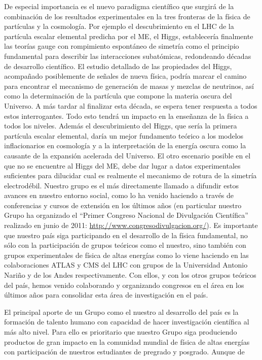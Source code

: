 \begin{bbrpvlhc}
De especial importancia es el nuevo paradigma científico que surgirá
de la combinación de los resultados experimentales en la tres
fronteras de la física de partículas y la cosmología. Por ejemplo el
descubrimiento en el LHC de la partícula escalar elemental predicha
por el ME, el Higgs, establecería finalmente las teorías gauge con
rompimiento espontáneo de simetría como el principio fundamental para
describir las interacciones subatómicas, redondeando décadas de
desarrollo científico.  El estudio detallado de las propiedades del
Higgs, acompañado posiblemente de señales de nueva física, podría
marcar el camino para encontrar el mecanismo de generación de masas y
mezclas de neutrinos, así como la determinación de la partícula que
compone la materia oscura del Universo. A más tardar al finalizar esta
década, se espera tener respuesta a todos estos interrogantes. Todo
esto tendrá un impacto en la enseñanza de la física a todos los
niveles. Además el descubrimiento del Higgs, que sería la primera
partícula escalar elemental, daría un mejor fundamento teórico a los
modelos inflacionarios en cosmología y a la interpretación de la
energía oscura como la causante de la expansión acelerada del
Universo. El otro escenario posible en el que no se encuentre al Higgs
del ME, debe dar lugar a datos experimentales suficientes para
dilucidar cual es realmente el mecanismo de rotura de la simetría
electrodébil. Nuestro grupo es el más directamente llamado a difundir
estos avances en nuestro entorno social, como lo ha venido haciendo a
través de conferencias y cursos de extensión en los últimos años (en
particular nuestro Grupo ha organizado el ``Primer Congreso Nacional
de Divulgación Científica'' realizado en junio de 2011:
\url{http://www.congresodivulgacion.org/}). Es importante que nuestro
país siga participando en el desarrollo de la física fundamental, no
sólo con la participación de grupos teóricos como el nuestro, sino
también con grupos experimentales de física de altas energías como lo
viene haciendo en las colaboraciones ATLAS y CMS del LHC con grupos de
la Universidad Antonio Nariño y de los Andes respectivamente. Con
ellos, y con los otros grupos teóricos del país, hemos venido
colaborando y organizando congresos en el área en los últimos años
para consolidar esta área de investigación en el país.

El principal aporte de un Grupo como el nuestro al desarrollo del país
es la formación de talento humano con capacidad de hacer investigación
científica al más alto nivel. Para ello es prioritario que nuestro
Grupo siga produciendo productos de gran impacto en la comunidad
mundial de física de altas energías con participación de nuestros
estudiantes de pregrado y posgrado.  Aunque de momento los doctores
que formamos son rápidamente reabsorbidos en el ámbito académico,
esperamos que a futuro, como pasa en otros países donde profesionales
de este tipo son muy apreciados en empresas de innovación tecnológica,
los nuestros puedan llegar a hacer aportes significativos a otros
sectores de la sociedad. También hemos logrado capacitar nuestro
equipo técnico en herramientas de computación científica y de
administración de redes en Linux.



\end{bbrpvlhc}
